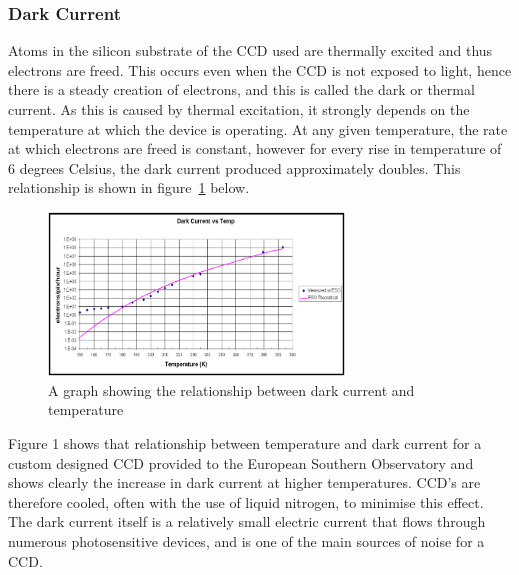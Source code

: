 	\subsubsection{Dark Current} %
	\label{ssub:dark_current}
		Atoms in the silicon substrate of the CCD used are thermally excited and thus electrons are freed. This occurs even when the CCD is not exposed to light, hence there is a steady creation of electrons, and this is called the dark or thermal current. As this is caused by thermal excitation, it strongly depends on the temperature at which the device is operating. At any given temperature, the rate at which electrons are freed is constant, however for every rise in temperature of 6 degrees Celsius, the dark current produced approximately doubles\cite[pages~124--125]{Astronomical_Image_Processing}. This relationship is shown in figure~\ref{fig:dark_current} below\cite{Southern_Observatory_throughput}.
		\begin{figure}[ht]
			\centering
			\includegraphics[width=0.7\textwidth]{../Images/Dark.png}
			\caption{A graph showing the relationship between dark current and temperature}\label{fig:dark_current}
		\end{figure}

		Figure 1 shows that relationship between temperature and dark current for a custom designed CCD provided to the European Southern Observatory and shows clearly the increase in dark current at higher temperatures. CCD’s are therefore cooled, often with the use of liquid nitrogen, to minimise this effect. The dark current itself is a relatively small electric current that flows through numerous photosensitive devices, and is one of the main sources of noise for a CCD.

